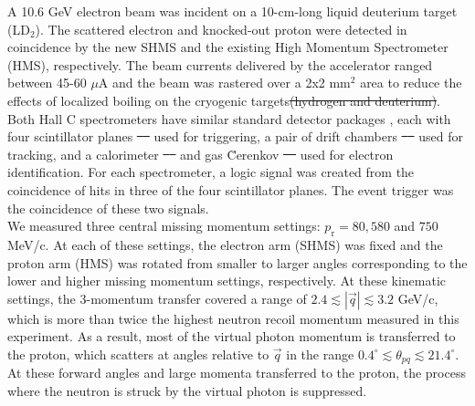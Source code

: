 \documentclass[aps,prl,twocolumn,showpacs,superscriptaddress,groupedaddress]{revtex4-2}  %
\providecommand{\DIFaddtex}[1]{{\protect\color{blue}\uwave{#1}}} %
\providecommand{\DIFdeltex}[1]{{\protect\color{red}\sout{#1}}}                      %
\providecommand{\DIFaddbegin}{} %
\providecommand{\DIFaddend}{} %
\providecommand{\DIFdelbegin}{} %
\providecommand{\DIFdelend}{} %
\providecommand{\DIFadd}[1]{\texorpdfstring{\DIFaddtex{#1}}{#1}} %
\providecommand{\DIFdel}[1]{\texorpdfstring{\DIFdeltex{#1}}{}} %
\newcommand{\DIFscaledelfig}{0.5}
\newlength{\DIFdelgraphicswidth} %
\newlength{\DIFdelgraphicsheight} %
\newcommand{\DIFaddincludegraphics}[2][]{{\color{blue}\fbox{\DIFOincludegraphics[#1]{#2}}}} %
\newcommand{\DIFdelincludegraphics}[2][]{%
\sbox{\DIFdelgraphicsbox}{\DIFOincludegraphics[#1]{#2}}%
\settoboxwidth{\DIFdelgraphicswidth}{\DIFdelgraphicsbox} %
\settoboxtotalheight{\DIFdelgraphicsheight}{\DIFdelgraphicsbox} %
\scalebox{\DIFscaledelfig}{%
\parbox[b]{\DIFdelgraphicswidth}{\usebox{\DIFdelgraphicsbox}\\[-\baselineskip] \rule{\DIFdelgraphicswidth}{0em}}\llap{\resizebox{\DIFdelgraphicswidth}{\DIFdelgraphicsheight}{%
\setlength{\unitlength}{\DIFdelgraphicswidth}%
\begin{picture}(1,1)%
\thicklines\linethickness{2pt} %
{\color[rgb]{1,0,0}\put(0,0){\framebox(1,1){}}}%
{\color[rgb]{1,0,0}\put(0,0){\line( 1,1){1}}}%
{\color[rgb]{1,0,0}\put(0,1){\line(1,-1){1}}}%
\end{picture}%
}\hspace*{3pt}}} %
} %
\DeclareRobustCommand{\DIFaddbegin}{\DIFOaddbegin \let\includegraphics\DIFaddincludegraphics} %
\DeclareRobustCommand{\DIFaddend}{\DIFOaddend \let\includegraphics\DIFOincludegraphics} %
\DeclareRobustCommand{\DIFdelbegin}{\DIFOdelbegin \let\includegraphics\DIFdelincludegraphics} %
\DeclareRobustCommand{\DIFdelend}{\DIFOaddend \let\includegraphics\DIFOincludegraphics} %
\begin{document}
\indent A 10.6 GeV electron beam was incident on a 10-cm-long liquid deuterium target (LD$_{2}$). The scattered electron and knocked-out proton were detected in coincidence
by the new SHMS and the existing High Momentum Spectrometer (HMS), respectively. The beam currents delivered by the accelerator ranged between 45-60 $\mu$A and the beam was rastered over a 2x2 mm$^{2}$ area to reduce the effects of localized boiling on the cryogenic targets\DIFdelbegin \DIFdel{(hydrogen and deuterium)}\DIFdelend .\\ %
\indent Both Hall C spectrometers have similar standard detector packages \DIFaddbegin \DIFadd{\mbox{%
\cite{cyero_phdthesis}}\hspace{0pt}%
}\DIFaddend , each with four scintillator planes \DIFdelbegin \DIFdel{\mbox{%
\cite{hodo_techreport} }\hspace{0pt}%
}\DIFdelend used for triggering, a pair of drift chambers \DIFdelbegin \DIFdel{\mbox{%
\cite{dc_techreport} }\hspace{0pt}%
}\DIFdelend used for tracking, and a calorimeter \DIFdelbegin \DIFdel{\mbox{%
\cite{Mkrtchyan_2013} }\hspace{0pt}%
}\DIFdelend and gas \u{C}erenkov \DIFdelbegin \DIFdel{\mbox{%
\cite{Li_Wenliang_mthesis,ngc_techreport} }\hspace{0pt}%
}\DIFdelend used for electron identification.
For each spectrometer, a logic signal was created from  the coincidence of hits in three of the four scintillator planes. The event trigger was the coincidence of these two signals. \\
\indent We measured three central missing momentum settings: $p_{\mathrm{r}}=80, 580$ and $750$ MeV/c. At each of these settings, the electron arm (SHMS) was fixed and the proton arm (HMS) was rotated from smaller to larger angles corresponding to
the lower and higher missing momentum settings, respectively. At these kinematic settings, the 3-momentum transfer covered a range of $2.4\lesssim|\vec{q}|\lesssim3.2$ GeV/c, which is more than twice the highest neutron recoil momentum
measured in this experiment. As a result, most of the virtual photon momentum is transferred to the proton, which scatters at angles relative to $\vec{q}$ in the range $0.4^{\circ}\lesssim \theta_{pq}\lesssim21.4^{\circ}$.
At these forward angles and large momenta transferred to the proton, the  process where the neutron is struck by the virtual photon is suppressed.\\
\end{document}
